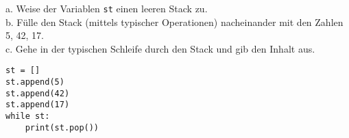 \question[4]
a. Weise der Variablen \texttt{st} einen leeren Stack zu. \\
b. Fülle den Stack (mittels typischer Operationen)
nacheinander mit den Zahlen 5, 42, 17. \\
c. Gehe in der typischen Schleife durch den Stack und gib den Inhalt aus.
\begin{solutionbox}{5cm}
\begin{lstlisting}
st = []
st.append(5)
st.append(42)
st.append(17)
while st:
    print(st.pop())
\end{lstlisting}
\end{solutionbox}
